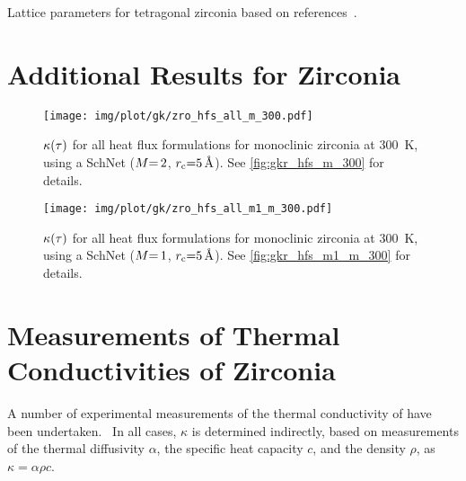 \vspace{2\baselineskip}

\begin{table}
    \caption{Lattice parameters for tetragonal zirconia based on references~\cite{ps1969t,kh1998t,vkjk2021q}.}
	
    \label{tab:si-zro_cells_tetra}
\end{table}

\clearpage

\section{Additional Results for Zirconia}


\begin{figure}
  \texttt{[image: img/plot/gk/zro\_hfs\_all\_m\_300.pdf]}
  \caption{
  $\kappa(\tau)$ for all heat flux formulations for monoclinic zirconia at \qty{300}{K},
  using a SchNet \glp ($M{=\,}2$, $r_{\text{c}}{=}\qty{5}{\angstrom}$).
  See \cref{fig:gkr_hfs_m_300} for details.
  }
  \label{fig:si-gkr_hfs_all_m_300}
\end{figure}
\vspace{4\baselineskip}

\begin{figure}
  \texttt{[image: img/plot/gk/zro\_hfs\_all\_m1\_m\_300.pdf]}
  \caption{
  $\kappa(\tau)$ for all heat flux formulations for monoclinic zirconia at \qty{300}{K},
  using a SchNet \glp ($M{=\,}1$, $r_{\text{c}}{=}\qty{5}{\angstrom}$).
  See \cref{fig:gkr_hfs_m1_m_300} for details.
  }
  \label{fig:si-gkr_hfs_all_m1_m_300}
\end{figure}

\clearpage
\section{Measurements of Thermal Conductivities of Zirconia}
\label{sec:si-gknet_zro_exp}

\noindent
A number of experimental measurements of the thermal conductivity of \zro{} have been undertaken.~\cite{hjls1987t,rwpm1998t,bflm2000t,mlld2004t} 
In all cases, $\kappa$ is determined indirectly, based on measurements of the thermal diffusivity $\alpha$, the specific heat capacity $c$, and the density $\rho$, as $\kappa = \alpha \rho c$.

